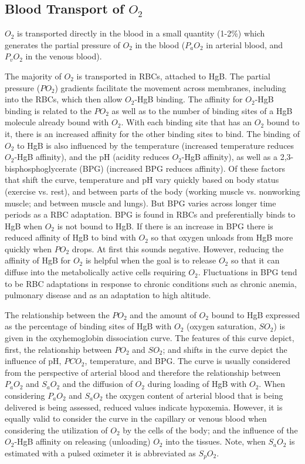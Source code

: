 \subsection{Blood Transport of $O_2$}

$O_2$ is transported directly in the blood in a small quantity (1-2\%) which generates the partial pressure of $O_2$ in the blood ($P_aO_2$ in arterial blood, and $P_vO_2$ in the venous blood). 

The majority of $O_2$ is transported in RBCs, attached to HgB. The partial pressure ($PO_2$) gradients facilitate the movement across membranes, including into the RBCs, which then allow $O_2$-HgB binding. The affinity for $O_2$-HgB binding is related to the $PO_2$ as well as to the number of binding sites of a HgB molecule already bound with $O_2$. With each binding site that has an $O_2$ bound to it, there is an increased affinity for the other binding sites to bind. The binding of $O_2$ to HgB is also influenced by the temperature (increased temperature reduces $O_2$-HgB affinity), and the pH (acidity reduces $O_2$-HgB affinity), as well as a 2,3-bisphosphoglycerate (BPG) (increased BPG reduces affinity). Of these factors that shift the curve, temperature and pH vary quickly based on body status (exercise vs. rest), and between parts of the body (working muscle vs. nonworking muscle; and between muscle and lungs). But BPG varies across longer time periods as a RBC adaptation. 
BPG is found in RBCs and preferentially binds to HgB when $O_2$ is not bound to HgB. If there is an increase in BPG there is reduced affinity of HgB to bind with $O_2$ so that oxygen unloads from HgB more quickly when $PO_2$ drops. At first this sounds negative. However, reducing the affinity of HgB for $O_2$ is helpful when the goal is to release $O_2$ so that it can diffuse into the metabolically active cells requiring $O_2$. Fluctuations in BPG tend to be RBC adaptations in response to chronic conditions such as chronic anemia, pulmonary disease and as an adaptation to high altitude.

The relationship between the $PO_2$ and the amount of $O_2$ bound to HgB expressed as the percentage of binding sites of HgB with $O_2$ (oxygen saturation, $SO_2$) is given in the oxyhemoglobin dissociation curve. The features of this curve depict, first, the relationship between $PO_2$ and $SO_2$; and shifts in the curve depict the influence of pH, $PCO_2$, temperature, and BPG. The curve is usually considered from the perspective of arterial blood and therefore the relationship between $P_aO_2$ and $S_aO_2$ and the diffusion of $O_2$ during loading of HgB with $O_2$. When considering $P_aO_2$ and $S_aO_2$ the oxygen content of arterial blood that is being delivered is being assessed, reduced values indicate hypoxemia. However, it is equally valid to consider the curve in the capillary or venous blood when considering the utilization of $O_2$ by the cells of the body; and the influence of the $O_2$-HgB affinity on releasing (unloading) $O_2$ into the tissues.
Note, when $S_aO_2$ is estimated with a pulsed oximeter it is abbreviated as $S_pO_2$.

